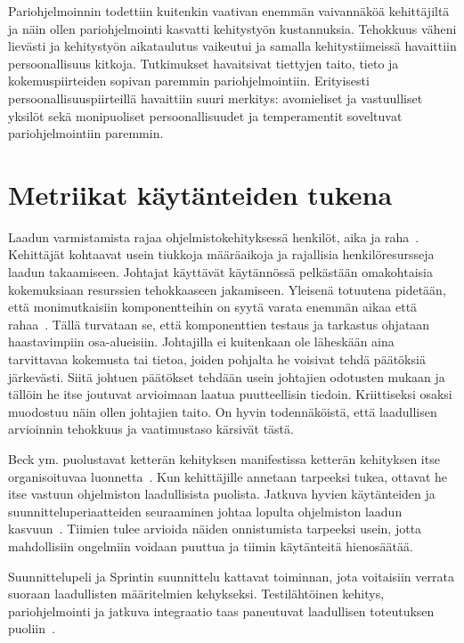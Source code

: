 \documentclass[finnish]{../tktltiki2}
\theoremstyle{definition}
\theoremstyle{remark}
\begin{document}
    Pariohjelmoinnin todettiin kuitenkin vaativan enemmän vaivannäköä kehittäjiltä ja näin ollen pariohjelmointi 
kasvatti kehitystyön kustannuksia. Tehokkuus väheni lievästi ja kehitystyön aikataulutus vaikeutui ja samalla 
kehitystiimeissä havaittiin persoonallisuus kitkoja. Tutkimukset havaitsivat tiettyjen taito, tieto ja kokemuspiirteiden 
sopivan paremmin pariohjelmointiin. Erityisesti persoonallisuuspiirteillä havaittiin suuri merkitys: avomieliset ja 
vastuulliset yksilöt sekä monipuoliset persoonallisuudet ja temperamentit soveltuvat pariohjelmointiin paremmin.

\section{Metriikat käytänteiden tukena}

Laadun varmistamista rajaa ohjelmistokehityksessä henkilöt, aika ja raha~\cite{ZN08}. Kehittäjät kohtaavat usein 
tiukkoja määräaikoja ja rajallisia henkilöresursseja laadun takaamiseen. Johtajat käyttävät käytännössä pelkästään 
omakohtaisia kokemuksiaan resurssien tehokkaaseen jakamiseen. Yleisenä totuutena pidetään, että monimutkaisiin 
komponentteihin on syytä varata enemmän aikaa että rahaa~\cite{ZN08}. Tällä turvataan se, että komponenttien testaus ja 
tarkastus ohjataan haastavimpiin osa-alueisiin. Johtajilla ei kuitenkaan ole läheskään aina tarvittavaa kokemusta tai 
tietoa, joiden pohjalta he voisivat tehdä päätöksiä järkevästi. Siitä johtuen päätökset tehdään usein johtajien 
odotusten mukaan ja tällöin he itse joutuvat arvioimaan laatua puutteellisin tiedoin. Kriittiseksi osaksi muodostuu näin 
ollen johtajien taito. On hyvin todennäköistä, että laadullisen arvioinnin tehokkuus ja vaatimustaso kärsivät tästä.

    Beck ym. puolustavat ketterän kehityksen manifestissa ketterän kehityksen itse organisoituvaa 
luonnetta~\cite{BBB01}. Kun kehittäjille annetaan tarpeeksi tukea, ottavat he itse vastuun ohjelmiston laadullisista 
puolista. Jatkuva hyvien käytänteiden ja suunnitteluperiaatteiden seuraaminen johtaa lopulta ohjelmiston laadun 
kasvuun~\cite{SS10}. Tiimien tulee arvioida näiden onnistumista tarpeeksi usein, jotta mahdollisiin ongelmiin voidaan 
puuttua ja tiimin käytänteitä hienosäätää.

    Suunnittelupeli ja Sprintin suunnittelu kattavat toiminnan, jota voitaisiin verrata suoraan laadullisten
määritelmien kehykseksi. Testilähtöinen kehitys, pariohjelmointi ja jatkuva integraatio taas paneutuvat laadullisen 
toteutuksen puoliin~\cite{SS10}.
\end{document}
